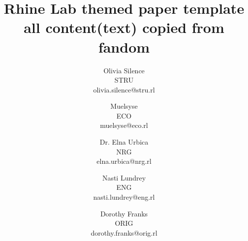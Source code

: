 \documentclass[12pt]{article}
\date{} %
\begin{document}
\title{\vspace{-1em}Rhine Lab themed paper template \\\large all content(text) copied from fandom}


\pagestyle{fancy}
\fancyhf{}
\fancyfoot[C]{\thepage}
\setlength{\headheight}{3em} %

\author{
    Olivia Silence\\
    STRU\\
    olivia.silence@stru.rl
    \and
    Muelsyse\\
    ECO\\
    muelsyse@eco.rl
    \and
    Dr. Elna Urbica\\
    NRG\\
    elna.urbica@nrg.rl
    \and
    Nasti Lundrey\\
    ENG\\
    nasti.lundrey@eng.rl
    \and
    Dorothy Franks\\
    ORIG\\
    dorothy.franks@orig.rl
}
\end{document}
